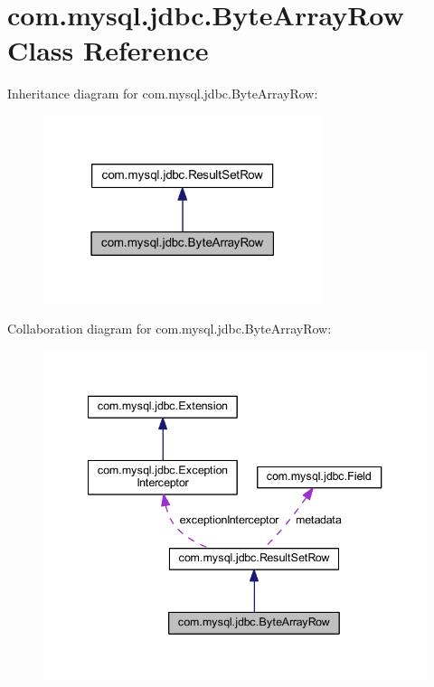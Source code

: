 \hypertarget{classcom_1_1mysql_1_1jdbc_1_1_byte_array_row}{}\section{com.\+mysql.\+jdbc.\+Byte\+Array\+Row Class Reference}
\label{classcom_1_1mysql_1_1jdbc_1_1_byte_array_row}


Inheritance diagram for com.\+mysql.\+jdbc.\+Byte\+Array\+Row\+:\nopagebreak
\begin{figure}[H]
\begin{center}
\leavevmode
\includegraphics[width=231pt]{classcom_1_1mysql_1_1jdbc_1_1_byte_array_row__inherit__graph}
\end{center}
\end{figure}


Collaboration diagram for com.\+mysql.\+jdbc.\+Byte\+Array\+Row\+:\nopagebreak
\begin{figure}[H]
\begin{center}
\leavevmode
\includegraphics[width=340pt]{classcom_1_1mysql_1_1jdbc_1_1_byte_array_row__coll__graph}
\end{center}
\end{figure}
